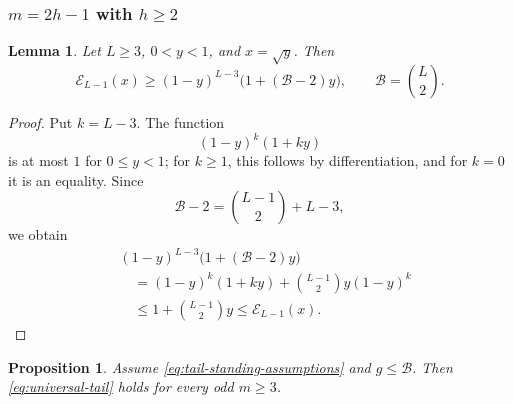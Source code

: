 \documentclass[12pt]{amsart}
\newcommand{\Bc}{\mathcal{B}}
\theoremstyle{plain}
\newtheorem{proposition}[theorem]{Proposition}
\newtheorem{lemma}[theorem]{Lemma}
\theoremstyle{definition}
\theoremstyle{remark}
\begin{document}
\subsubsection{\(m=2h-1\) with \(h\ge2\)}

\begin{lemma}\label{lem:E-lower-bound}
Let \(L\ge3\), \(0<y<1\), and \(x=\sqrt y\).  Then
\begin{equation}\label{eq:E-lower-bound}
 \mathcal E_{L-1}(x)
 \ge
 (1-y)^{L-3}\bigl(1+(\Bc-2)y\bigr),
 \qquad
 \Bc=\binom L2.
\end{equation}
\end{lemma}

\begin{proof}
Put \(k=L-3\).  The function
\[
 (1-y)^k(1+ky)
\]
is at most \(1\) for \(0\le y<1\); for \(k\ge1\), this follows by
differentiation, and for \(k=0\) it is an equality.  Since
\[
 \Bc-2=\binom{L-1}{2}+L-3,
\]
we obtain
\begin{align*}
 &(1-y)^{L-3}\bigl(1+(\Bc-2)y\bigr)\\
 &\quad=
 (1-y)^k(1+ky)
 +\binom{L-1}{2}y(1-y)^k\\
 &\quad\le
 1+\binom{L-1}{2}y
 \le\mathcal E_{L-1}(x).
\end{align*}
\end{proof}

\begin{proposition}\label{prop:odd-centres}
Assume \eqref{eq:tail-standing-assumptions} and \(g\le\Bc\).  Then
\eqref{eq:universal-tail} holds for every odd \(m\ge3\).
\end{proposition}
\end{document}
